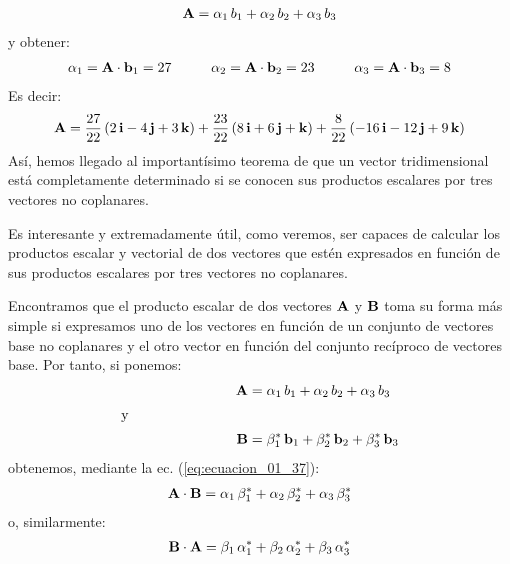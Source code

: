 \documentclass[12pt]{article}
\begin{document}
\begin{align*}
    \vb{A} = \alpha_{1} \, b_{1} + \alpha_{2} \, b_{2} + \alpha_{3} \, b_{3}
\end{align*}
y obtener:
\begin{align*}
    \alpha_{1} = \vb{A} \cdot \vb{b}_{1} = 27 \hspace{1cm} \alpha_{2} = \vb{A} \cdot \vb{b}_{2} = 23 \hspace{1cm} \alpha_{3} = \vb{A} \cdot \vb{b}_{3} = 8
\end{align*}
Es decir:
\begin{align*}
    \vb{A} = \dfrac{27}{22} \left( 2 \, \vb{i} - 4 \, \vb{j} + 3 \, \vb{k} \right) + \dfrac{23}{22} \left( 8 \, \vb{i} + 6 \, \vb{j} + \vb{k} \right) + \dfrac{8}{22} \left( -16 \, \vb{i} - 12 \, \vb{j} + 9 \, \vb{k} \right)
\end{align*}
Así, hemos llegado al importantísimo teorema de que un vector tridimensional está completamente determinado si se conocen sus productos escalares por tres vectores no coplanares.
\par
Es interesante y extremadamente útil, como veremos, ser capaces de calcular los productos escalar y vectorial de dos vectores que estén expresados en función de sus productos escalares por tres vectores no coplanares.
\par
Encontramos que el producto escalar de dos vectores $\vb{A}$ y $\vb{B}$ toma su forma más simple si expresamos uno de los vectores en función de un conjunto de vectores base no coplanares y el otro vector en función del conjunto recíproco de vectores base. Por tanto, si ponemos:
\begin{align}
\begin{aligned}
    \vb{A} &= \alpha_{1} \, b_{1} + \alpha_{2} \, b_{2} + \alpha_{3} \, b_{3} \\[0.25em]
    \text{y} \hspace{3cm} &{} \\[0.25em]
    \vb{B} &= \beta_{1}^{*} \, \vb{b}_{1} + \beta_{2}^{*} \, \vb{b}_{2} + \beta_{3}^{*} \, \vb{b}_{3}
    \end{aligned}
    \label{eq:ecuacion_01_45}
\end{align}
obtenemos, mediante la ec. (\ref{eq:ecuacion_01_37}):
\begin{align}
    \vb{A} \cdot \vb{B} = \alpha_{1} \, \beta_{1}^{*} + \alpha_{2} \, \beta_{2}^{*} + \alpha_{3} \, \beta_{3}^{*}
    \label{eq:ecuacion_01_46}
\end{align}
o, similarmente:
\begin{align}
    \vb{B} \cdot \vb{A} = \beta_{1} \, \alpha_{1}^{*} + \beta_{2} \, \alpha_{2}^{*} + \beta_{3} \, \alpha_{3}^{*}
    \label{eq:ecuacion_01_47}
\end{align}
\end{document}
